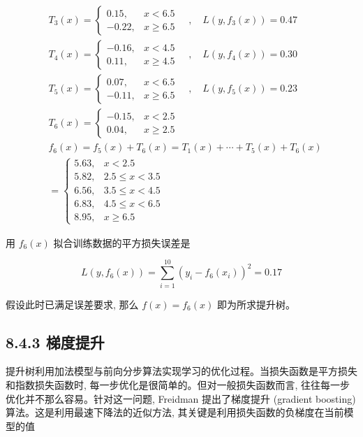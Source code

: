 \documentclass[10pt]{article}
\begin{document}
$$
\begin{aligned}
& T_{3}(x)=\left\{\begin{array}{ll}
0.15, & x<6.5 \\
-0.22, & x \geqslant 6.5
\end{array} \quad, \quad L\left(y, f_{3}(x)\right)=0.47\right. \\
& T_{4}(x)=\left\{\begin{array}{ll}
-0.16, & x<4.5 \\
0.11, & x \geqslant 4.5
\end{array} \quad, \quad L\left(y, f_{4}(x)\right)=0.30\right. \\
& T_{5}(x)=\left\{\begin{array}{ll}
0.07, & x<6.5 \\
-0.11, & x \geqslant 6.5
\end{array} \quad, \quad L\left(y, f_{5}(x)\right)=0.23\right. \\
& T_{6}(x)= \begin{cases}-0.15, & x<2.5 \\
0.04, & x \geqslant 2.5\end{cases} \\
& f_{6}(x)=f_{5}(x)+T_{6}(x)=T_{1}(x)+\cdots+T_{5}(x)+T_{6}(x) \\
& = \begin{cases}5.63, & x<2.5 \\
5.82, & 2.5 \leqslant x<3.5 \\
6.56, & 3.5 \leqslant x<4.5 \\
6.83, & 4.5 \leqslant x<6.5 \\
8.95, & x \geqslant 6.5\end{cases}
\end{aligned}
$$

用 $f_{6}(x)$ 拟合训练数据的平方损失误差是

$$
L\left(y, f_{6}(x)\right)=\sum_{i=1}^{10}\left(y_{i}-f_{6}\left(x_{i}\right)\right)^{2}=0.17
$$

假设此时已满足误差要求, 那么 $f(x)=f_{6}(x)$ 即为所求提升树。

\subsection*{8.4.3 梯度提升}
提升树利用加法模型与前向分步算法实现学习的优化过程。当损失函数是平方损失和指数损失函数时, 每一步优化是很简单的。但对一般损失函数而言, 往往每一步优化并不那么容易。针对这一问题, Freidman 提出了梯度提升 (gradient boosting) 算法。这是利用最速下降法的近似方法, 其关键是利用损失函数的负梯度在当前模型的值
\end{document}
